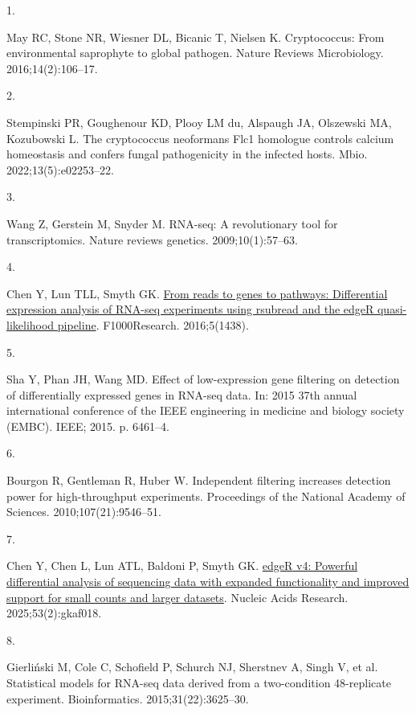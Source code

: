 \documentclass[
  a4paper,
]{scrreprt}
\newlength{\cslhangindent}
\newlength{\csllabelwidth}
\newenvironment{CSLReferences}[2] %
 {\begin{list}{}{%
  \setlength{\itemindent}{0pt}
  \setlength{\leftmargin}{0pt}
  \setlength{\parsep}{0pt}
  \ifodd #1
   \setlength{\leftmargin}{\cslhangindent}
   \setlength{\itemindent}{-1\cslhangindent}
  \fi
  \setlength{\itemsep}{#2\baselineskip}}}
 {\end{list}}
\newcommand{\CSLLeftMargin}[1]{\parbox[t]{\csllabelwidth}{\strut#1\strut}}
\newcommand{\CSLRightInline}[1]{\parbox[t]{\linewidth - \csllabelwidth}{\strut#1\strut}}
\begin{document}
\label{refs}
\begin{CSLReferences}{0}{1}
\CSLLeftMargin{1. }%
\CSLRightInline{May RC, Stone NR, Wiesner DL, Bicanic T, Nielsen K.
Cryptococcus: From environmental saprophyte to global pathogen. Nature
Reviews Microbiology. 2016;14(2):106--17. }

\CSLLeftMargin{2. }%
\CSLRightInline{Stempinski PR, Goughenour KD, Plooy LM du, Alspaugh JA,
Olszewski MA, Kozubowski L. The cryptococcus neoformans Flc1 homologue
controls calcium homeostasis and confers fungal pathogenicity in the
infected hosts. Mbio. 2022;13(5):e02253--22. }

\CSLLeftMargin{3. }%
\CSLRightInline{Wang Z, Gerstein M, Snyder M. RNA-seq: A revolutionary
tool for transcriptomics. Nature reviews genetics. 2009;10(1):57--63. }

\CSLLeftMargin{4. }%
\CSLRightInline{Chen Y, Lun TLL, Smyth GK.
\href{https://doi.org/10.12688/f1000research.8987.2}{From reads to genes
to pathways: Differential expression analysis of RNA-seq experiments
using rsubread and the edgeR quasi-likelihood pipeline}. F1000Research.
2016;5(1438). }

\CSLLeftMargin{5. }%
\CSLRightInline{Sha Y, Phan JH, Wang MD. Effect of low-expression gene
filtering on detection of differentially expressed genes in RNA-seq
data. In: 2015 37th annual international conference of the IEEE
engineering in medicine and biology society (EMBC). IEEE; 2015. p.
6461--4. }

\CSLLeftMargin{6. }%
\CSLRightInline{Bourgon R, Gentleman R, Huber W. Independent filtering
increases detection power for high-throughput experiments. Proceedings
of the National Academy of Sciences. 2010;107(21):9546--51. }

\CSLLeftMargin{7. }%
\CSLRightInline{Chen Y, Chen L, Lun ATL, Baldoni P, Smyth GK.
\href{https://doi.org/10.1093/nar/gkaf018}{{edgeR} v4: Powerful
differential analysis of sequencing data with expanded functionality and
improved support for small counts and larger datasets}. Nucleic Acids
Research. 2025;53(2):gkaf018. }

\CSLLeftMargin{8. }%
\CSLRightInline{Gierliński M, Cole C, Schofield P, Schurch NJ, Sherstnev
A, Singh V, et al. Statistical models for RNA-seq data derived from a
two-condition 48-replicate experiment. Bioinformatics.
2015;31(22):3625--30. }


\end{CSLReferences}
\end{document}
